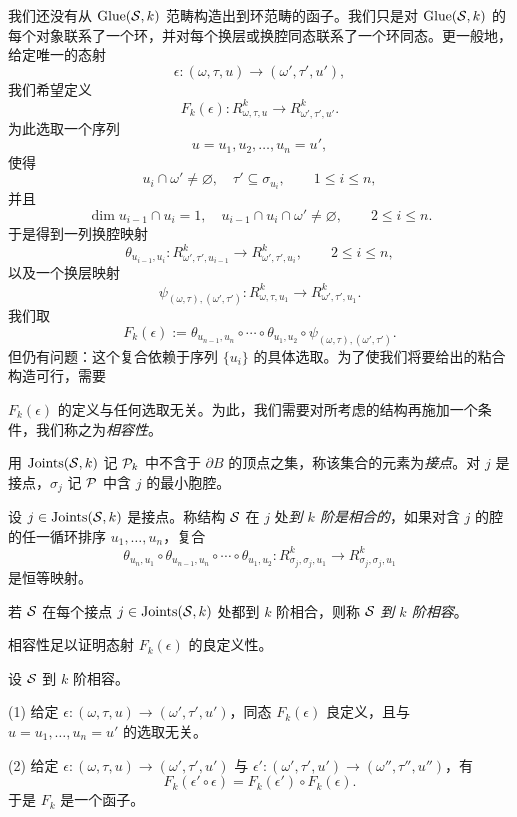 我们还没有从 $\operatorname{Glue}(\mathcal{S},k)$ 范畴构造出到环范畴的函子。我们只是对 $\operatorname{Glue}(\mathcal{S},k)$ 的每个对象联系了一个环，并对每个换层或换腔同态联系了一个环同态。更一般地，给定唯一的态射
\[
  \epsilon:(\omega,\tau,u)\to(\omega',\tau',u'),
\]
我们希望定义
\[
  F_k(\epsilon):R^k_{\omega,\tau,u}\to R^k_{\omega',\tau',u'}.
\]
为此选取一个序列
\[
  u=u_1,u_2,\ldots,u_n=u',
\]
使得
\[
  u_i\cap\omega'\ne\varnothing,\quad \tau'\subseteq\sigma_{u_i},
  \qquad 1\le i\le n,
\]
并且
\[
  \dim u_{i-1}\cap u_i=1,\quad
  u_{i-1}\cap u_i\cap\omega'\ne\varnothing,
  \qquad 2\le i\le n.
\]
于是得到一列换腔映射
\[
  \theta_{u_{i-1},u_i}:R^k_{\omega',\tau',u_{i-1}}\to R^k_{\omega',\tau',u_i},
  \qquad 2\le i\le n,
\]
以及一个换层映射
\[
  \psi_{(\omega,\tau),(\omega',\tau')}:R^k_{\omega,\tau,u_1}\to R^k_{\omega',\tau',u_1}.
\]
我们取
\[
  F_k(\epsilon):=\theta_{u_{n-1},u_n}\circ\cdots\circ\theta_{u_1,u_2}
  \circ\psi_{(\omega,\tau),(\omega',\tau')}.
\]
但仍有问题：这个复合依赖于序列 $\{u_i\}$ 的具体选取。为了使我们将要给出的粘合构造可行，需要

$F_k(\epsilon)$ 的定义与任何选取无关。为此，我们需要对所考虑的结构再施加一个条件，我们称之为\emph{相容性}。

\begin{definition}
用 $\operatorname{Joints}(\mathcal{S},k)$ 记 $\mathcal{P}_k$ 中不含于 $\partial B$ 的顶点之集，称该集合的元素为\emph{接点}。对 $j$ 是接点，$\sigma_j$ 记 $\mathcal{P}$ 中含 $j$ 的最小胞腔。
\end{definition}

\begin{definition}
设 $j\in\operatorname{Joints}(\mathcal{S},k)$ 是接点。称结构 $\mathcal{S}$ 在 $j$ 处\emph{到 $k$ 阶是相合的}，如果对含 $j$ 的腔的任一循环排序 $u_1,\ldots,u_n$，复合
\[
  \theta_{u_n,u_1}\circ\theta_{u_{n-1},u_n}\circ\cdots\circ\theta_{u_1,u_2}:
  R^k_{\sigma_j,\sigma_j,u_1}\to R^k_{\sigma_j,\sigma_j,u_1}
\]
是恒等映射。

若 $\mathcal{S}$ 在每个接点 $j\in\operatorname{Joints}(\mathcal{S},k)$ 处都到 $k$ 阶相合，则称 $\mathcal{S}$ \emph{到 $k$ 阶相容}。
\end{definition}

相容性足以证明态射 $F_k(\epsilon)$ 的良定义性。

\begin{theorem}
设 $\mathcal{S}$ 到 $k$ 阶相容。

(1) 给定 $\epsilon:(\omega,\tau,u)\to(\omega',\tau',u')$，同态 $F_k(\epsilon)$ 良定义，且与 $u=u_1,\ldots,u_n=u'$ 的选取无关。

(2) 给定 $\epsilon:(\omega,\tau,u)\to(\omega',\tau',u')$ 与
$\epsilon':(\omega',\tau',u')\to(\omega'',\tau'',u'')$，有
\[
  F_k(\epsilon'\circ\epsilon)=F_k(\epsilon')\circ F_k(\epsilon).
\]
于是 $F_k$ 是一个函子。
\end{theorem}

